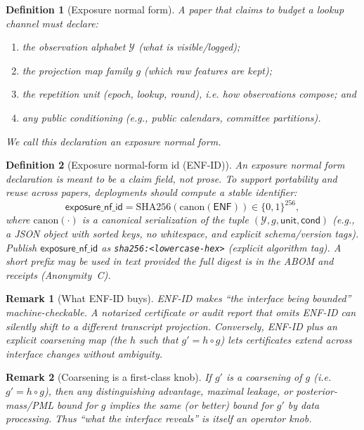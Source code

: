 \documentclass[11pt]{article}
\newtheorem{definition}{Definition}
\newtheorem{remark}{Remark}
\begin{document}
\begin{definition}[Exposure normal form]
A paper that claims to budget a lookup channel must declare:
\begin{enumerate}[leftmargin=*]
\item the observation alphabet $\mathcal{Y}$ (what is visible/logged);
\item the projection map family $g$ (which raw features are kept);
\item the repetition unit (epoch, lookup, round), i.e. how observations compose; and
\item any public conditioning (e.g., public calendars, committee partitions).
\end{enumerate}
We call this declaration an \emph{exposure normal form}.
\end{definition}

\begin{definition}[Exposure normal-form id (ENF-ID)]
An exposure normal form declaration is meant to be a \emph{claim field}, not prose.
To support portability and reuse across papers, deployments should compute a stable identifier:
\[
\mathsf{exposure\_nf\_id}=\mathrm{SHA256}(\mathrm{canon}(\mathsf{ENF}))\in\{0,1\}^{256},
\]
where $\mathrm{canon}(\cdot)$ is a canonical serialization of the tuple
$(\mathcal Y,g,\mathsf{unit},\mathsf{cond})$ (e.g., a JSON object with sorted keys, no whitespace, and explicit schema/version tags).
Publish $\mathsf{exposure\_nf\_id}$ as \texttt{sha256:<lowercase-hex>} (explicit algorithm tag). A short prefix may be used in text provided the full digest is in the ABOM and receipts (Anonymity~C).
\end{definition}

\begin{remark}[What ENF-ID buys]
ENF-ID makes ``the interface being bounded'' machine-checkable.
A notarized certificate or audit report that omits ENF-ID can silently shift to a different transcript projection.
Conversely, ENF-ID plus an explicit \emph{coarsening map} (the $h$ such that $g'=h\circ g$) lets certificates extend across interface changes without ambiguity.
\end{remark}


\begin{remark}[Coarsening is a first-class knob]
If $g'$ is a coarsening of $g$ (i.e. $g' = h\circ g$), then any distinguishing advantage, maximal leakage, or posterior-mass/PML bound for $g$ implies the same (or better) bound for $g'$ by data processing.
Thus ``what the interface reveals'' is itself an operator knob.
\end{remark}
\end{document}
